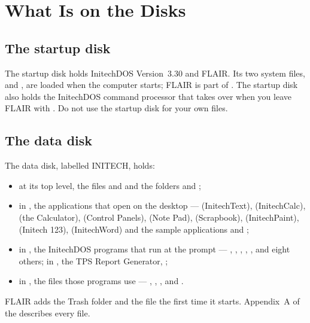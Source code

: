 \chapter{What Is on the Disks}

\section{The startup disk}
The startup disk holds InitechDOS Version~3.30 and FLAIR.  Its two system
files,  and , are loaded when the computer
starts; FLAIR is part of .  The startup disk also holds
the InitechDOS command processor that takes over when you leave FLAIR with
.  Do not use the startup disk for your own
files.

\section{The data disk}
The data disk, labelled INITECH, holds:
\begin{itemize}
\item at its top level, the files  and 
  and the folders  and ;
\item in , the applications that open on the desktop ---
   (InitechText),  (InitechCalc),
   (the Calculator),  (Control Panels),
   (Note Pad),  (Scrapbook),
   (InitechPaint),
   (Initech 123),  (InitechWord) and the
  sample applications  and ;
\item in , the InitechDOS programs that run at the prompt ---
  , , , ,
  ,  and eight others; in , the
  TPS Report Generator, ;
\item in , the files those programs use --- ,
  , ,  and
  .
\end{itemize}
FLAIR adds the Trash folder and the file  the first time it
starts.  Appendix~A of the  describes every
file.
